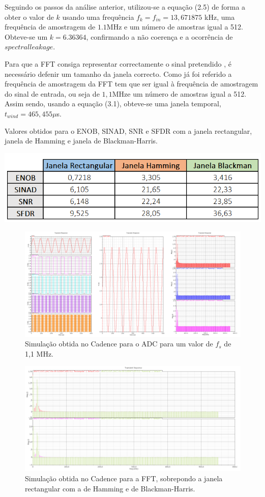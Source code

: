 \documentclass[11pt]{article}
\numberwithin{equation}{section}
\begin{document}
Seguindo os passos da análise anterior, utilizou-se a equação (2.5) de forma a obter o valor de $k$ usando uma frequência $f_{k} = f_{in} = 13,671875$ kHz, uma frequência de amostragem de $1.1$MHz e um número de amostras igual a 512. Obteve-se um $k=6.36364$, confirmando a não coerença e a ocorrência de $spectral leakage$.

Para que a FFT consiga representar correctamente o sinal pretendido , é necessário defenir um tamanho da janela correcto. Como já foi referido a frequência de amostragem da FFT tem que ser igual à frequência de amostragem do sinal de entrada, ou seja de $1,1$MHze um número de amostras igual a 512. Assim sendo, usando a equação (3.1), obteve-se uma janela temporal, $t_{wind} = 465,455\mu$s.

\begin{table}[h]
	\centering
	\caption{Valores obtidos para o ENOB, SINAD, SNR e SFDR com a janela rectangular, janela de Hamming e janela de Blackman-Harris.}
 	\includegraphics[keepaspectratio=true, scale=0.50]{lab/janelas.png}
\end{table}

\begin{figure}[h]
	\centering
	\includegraphics[keepaspectratio=true, scale=0.27]{lab/f_11M.png}
	\caption{Simulação obtida no Cadence para o ADC para um valor de $f_{s}$ de 1,1 MHz.}
	\vspace{-0.8em}
\end{figure}

\begin{figure}[h]
	\centering
	\includegraphics[keepaspectratio=true, scale=0.33]{lab/f_fft_11M.png}
	\caption{Simulação obtida no Cadence para a FFT, sobrepondo a janela rectangular com a de Hamming e de Blackman-Harris.}
	\vspace{-0.8em}
\end{figure}
	 
\end{document}
